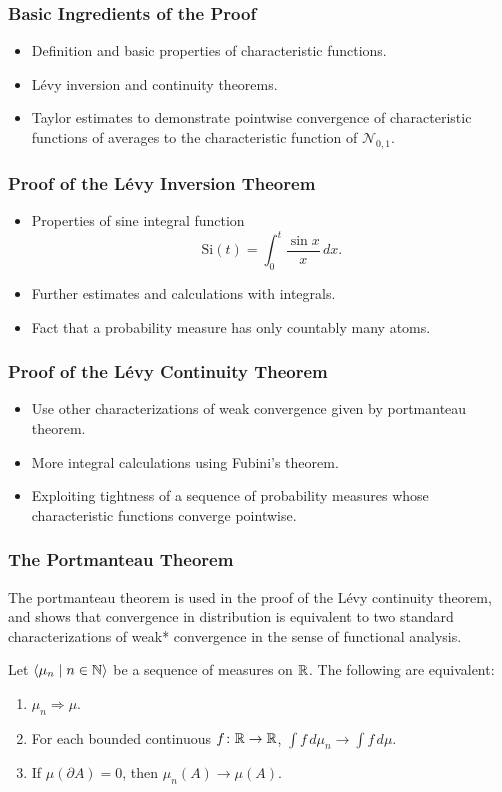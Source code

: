 \documentclass{beamer}
\newcommand\bldseq[2]{\langle{#1}\mid{#2}\rangle}
\newcommand\Si{\text{Si}}
\begin{document}
\begin{frame}
\frametitle{Basic Ingredients of the Proof}
\begin{itemize}
\item Definition and basic properties of characteristic functions. \pause
\item L\'evy inversion and continuity theorems. \pause
\item Taylor estimates to demonstrate pointwise convergence of characteristic functions of averages to the characteristic function of $\mathcal N_{0,1}$.
\end{itemize}
\end{frame}

\begin{frame}
\frametitle{Proof of the L\'evy Inversion Theorem}
\begin{itemize}
\item Properties of sine integral function
\[ \Si(t) = \int_0^t \frac{\sin x}{x} \, dx. \] \pause
\item Further estimates and calculations with integrals. \pause
\item Fact that a probability measure has only countably many atoms.
\end{itemize}
\end{frame}

\begin{frame}
\frametitle{Proof of the L\'evy Continuity Theorem}
\begin{itemize}
\item Use other characterizations of weak convergence given by portmanteau theorem. \pause
\item More integral calculations using Fubini's theorem. \pause
\item Exploiting tightness of a sequence of probability measures whose characteristic functions converge pointwise.
\end{itemize}
\end{frame}

\begin{frame}
\frametitle{The Portmanteau Theorem}
The portmanteau theorem is used in the proof of the L\'evy continuity theorem, and shows that convergence in distribution is equivalent to two standard characterizations of weak* convergence in the sense of functional analysis. \pause

\begin{theorem}
Let $\bldseq{\mu_n}{n \in \N}$ be a sequence of measures on $\mathbb{R}$. The following are equivalent:
\begin{enumerate}
\item $\mu_n \Rightarrow \mu$. \pause
\item For each bounded continuous $f\colon \mathbb{R} \rightarrow \mathbb{R}$, $\int f \, d\mu_n \rightarrow \int f \, d\mu$. \pause
\item If $\mu(\partial A) = 0$, then $\mu_n(A) \rightarrow \mu(A)$.
\end{enumerate}
\end{theorem}
\end{frame}
\end{document}
